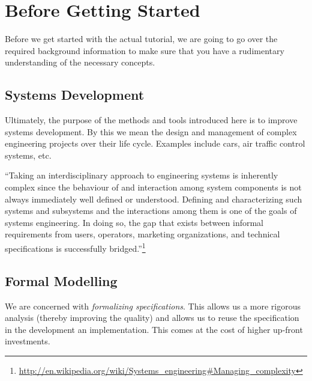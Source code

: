 \section{Before Getting Started}
\label{tut_before_getting_started}

Before we get started with the actual tutorial, we are going to go over the required background information to make sure that you have a rudimentary understanding of the necessary concepts.


\subsection{Systems Development}
\label{tut_systems_development}

Ultimately, the purpose of the methods and tools introduced here is to improve systems development.  By this we mean the design and management of complex engineering projects over their life cycle.  Examples include cars, air traffic control systems, etc.

``Taking an interdisciplinary approach to engineering systems is inherently complex since the behaviour of and interaction among system components is not always immediately well defined or understood. Defining and characterizing such systems and subsystems and the interactions among them is one of the goals of systems engineering. In doing so, the gap that exists between informal requirements from users, operators, marketing organizations, and technical specifications is successfully bridged.''\footnote{\url{http://en.wikipedia.org/wiki/Systems_engineering\#Managing_complexity}}

\subsection{Formal Modelling}
\label{tut_formal_modelling}

We are concerned with \textit{formalizing specifications}.  This allows us a more rigorous analysis (thereby improving the quality) and allows us to reuse the specification in the development an implementation.  This comes at the cost of higher up-front investments.

